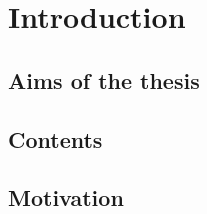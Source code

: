 \documentclass[thesis.tex]{subfiles}
\begin{document}
\chapter{Introduction}
\section{Aims of the thesis}
\section{Contents}
\section{Motivation}
\end{document}
